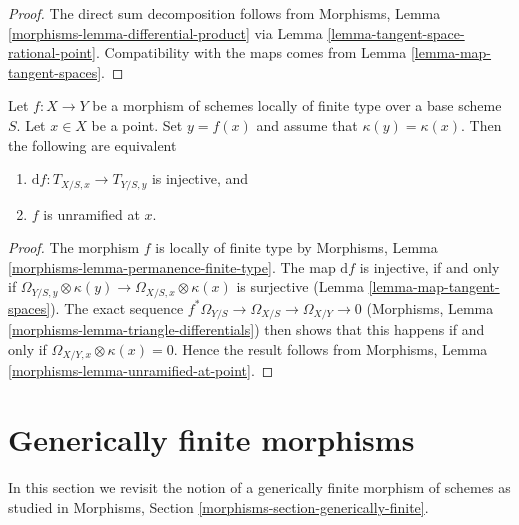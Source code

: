 \begin{proof}
The direct sum decomposition follows from
Morphisms, Lemma \ref{morphisms-lemma-differential-product}
via Lemma \ref{lemma-tangent-space-rational-point}. Compatibility
with the maps comes from Lemma \ref{lemma-map-tangent-spaces}.
\end{proof}

\begin{lemma}
\label{lemma-injective-tangent-spaces-unramified}
Let $f : X \to Y$ be a morphism of schemes locally of finite type over a
base scheme $S$. Let $x \in X$ be a point. Set $y = f(x)$ and assume
that $\kappa(y) = \kappa(x)$. Then the following are equivalent
\begin{enumerate}
\item $\text{d}f : T_{X/S, x} \longrightarrow T_{Y/S, y}$ is injective, and
\item $f$ is unramified at $x$.
\end{enumerate}
\end{lemma}

\begin{proof}
The morphism $f$ is locally of finite type by
Morphisms, Lemma \ref{morphisms-lemma-permanence-finite-type}.
The map $\text{d}f$ is injective, if and only if
$\Omega_{Y/S, y} \otimes \kappa(y) \to \Omega_{X/S, x} \otimes \kappa(x)$
is surjective (Lemma \ref{lemma-map-tangent-spaces}).
The exact sequence $f^*\Omega_{Y/S} \to \Omega_{X/S} \to \Omega_{X/Y} \to 0$
(Morphisms, Lemma \ref{morphisms-lemma-triangle-differentials})
then shows that this happens if and only if
$\Omega_{X/Y, x} \otimes \kappa(x) = 0$.
Hence the result follows from
Morphisms, Lemma \ref{morphisms-lemma-unramified-at-point}.
\end{proof}







\section{Generically finite morphisms}
\label{section-generically-finite}

\noindent
In this section we revisit the notion of a generically finite
morphism of schemes as studied in
Morphisms, Section \ref{morphisms-section-generically-finite}.

